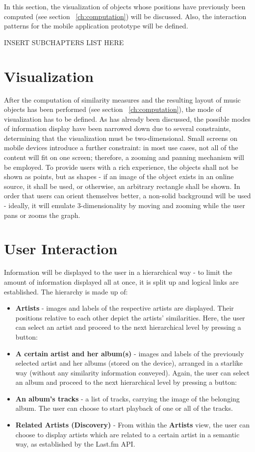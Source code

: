In this section, the visualization of objects whose positions have previously been computed (see section ~\ref{ch:computation}) will be discussed. Also, the interaction patterns for the mobile application prototype will be defined.

INSERT SUBCHAPTERS LIST HERE

\section{Visualization}

After the computation of similarity measures and the resulting layout of music objects has been performed (see section ~\ref{ch:computation}), the mode of visualization has to be defined. As has already been discussed, the possible modes of information display have been narrowed down due to several constraints, determining that the visualization must be two-dimensional. Small screens on mobile devices introduce a further constraint: in most use cases, not all of the content will fit on one screen; therefore, a zooming and panning mechanism will be employed. To provide users with a rich experience, the objects shall not be shown as points, but as shapes - if an image of the object exists in an online source, it shall be used, or otherwise, an arbitrary rectangle shall be shown. In order that users can orient themselves better, a non-solid background will be used - ideally, it will emulate 3-dimensionality by moving and zooming while the user pans or zooms the graph.

\section{User Interaction}

Information will be displayed to the user in a hierarchical way - to limit the amount of information displayed all at once, it is split up and logical links are established. The hierarchy is made up of:

\begin{itemize}
	\item \textbf{Artists} - images and labels of the respective artists are displayed. Their positions relative to each other depict the artists' similarities. Here, the user can select an artist and proceed to the next hierarchical level by pressing a button:
	\item \textbf{A certain artist and her album(s)} - images and labels of the previously selected artist and her albums (stored on the device), arranged in a starlike way (without any similarity information conveyed). Again, the user can select an album and proceed to the next hierarchical level by pressing a button:
	\item \textbf{An album's tracks} - a list of tracks, carrying the image of the belonging album. The user can choose to start playback of one or all of the tracks.
	\item \textbf{Related Artists (Discovery)} - From within the \textbf{Artists} view, the user can choose to display artists which are related to a certain artist in a semantic way, as established by the Last.fm API.
	
\end{itemize}

